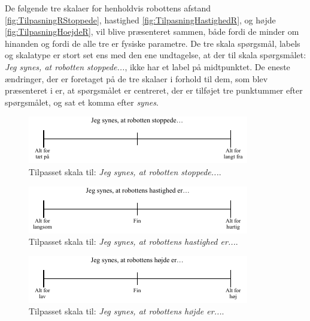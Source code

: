 \noindent
%
De følgende tre skalaer for henholdvis robottens afstand \autoref{fig:TilpasningRStoppede}, hastighed \autoref{fig:TilpasningHastighedR}, og højde \autoref{fig:TilpasningHoejdeR}, vil blive præsenteret sammen, både fordi de minder om hinanden og fordi de alle tre er fysiske parametre. De tre skala spørgsmål, labels og skalatype er stort set ens med den ene undtagelse, at der til skala spørgsmålet: \textit{Jeg synes, at robotten stoppede...}, ikke har et label på midtpunktet. De eneste ændringer, der er foretaget på de tre skalaer i forhold til dem, som blev præsenteret i  er, at spørgsmålet er centreret, der er tilføjet tre punktummer efter spørgsmålet, og sat et komma efter \textit{synes}.
%
\begin{figure}[H]
\centering
\includegraphics[width =\textwidth]{Figure/TilpasningAfSkalaer/TilpassetRStoppede} 
\caption{Tilpasset skala til: \textit{Jeg synes, at robotten stoppede...}.}
\label{fig:TilpasningRStoppede}
\end{figure}
\noindent
%
%
\begin{figure}[H]
\centering
\includegraphics[width =\textwidth]{Figure/TilpasningAfSkalaer/TilpassetHastighedR} 
\caption{Tilpasset skala til: \textit{Jeg synes, at robottens hastighed er...}.}
\label{fig:TilpasningHastighedR}
\end{figure}
\noindent
%
%
\begin{figure}[H]
\centering
\includegraphics[width =\textwidth]{Figure/TilpasningAfSkalaer/TilpassetHoejdeR} 
\caption{Tilpasset skala til: \textit{Jeg synes, at robottens højde er...}.}
\label{fig:TilpasningHoejdeR}
\end{figure}
